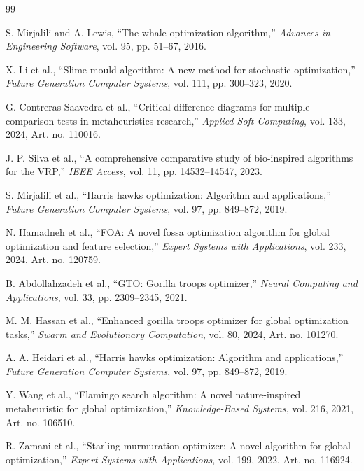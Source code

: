 \documentclass[10pt,a4paper]{extarticle}
\begin{document}
\begin{thebibliography}{99}

 S. Mirjalili and A. Lewis, ``The whale optimization algorithm,'' \textit{Advances in Engineering Software}, vol. 95, pp. 51--67, 2016.

 X. Li et al., ``Slime mould algorithm: A new method for stochastic optimization,'' \textit{Future Generation Computer Systems}, vol. 111, pp. 300--323, 2020.

 G. Contreras-Saavedra et al., ``Critical difference diagrams for multiple comparison tests in metaheuristics research,'' \textit{Applied Soft Computing}, vol. 133, 2024, Art. no. 110016.

 J. P. Silva et al., ``A comprehensive comparative study of bio-inspired algorithms for the VRP,'' \textit{IEEE Access}, vol. 11, pp. 14532--14547, 2023.

 S. Mirjalili et al., ``Harris hawks optimization: Algorithm and applications,'' \textit{Future Generation Computer Systems}, vol. 97, pp. 849--872, 2019.

 N. Hamadneh et al., ``FOA: A novel fossa optimization algorithm for global optimization and feature selection,'' \textit{Expert Systems with Applications}, vol. 233, 2024, Art. no. 120759.

 B. Abdollahzadeh et al., ``GTO: Gorilla troops optimizer,'' \textit{Neural Computing and Applications}, vol. 33, pp. 2309--2345, 2021.

 M. M. Hassan et al., ``Enhanced gorilla troops optimizer for global optimization tasks,'' \textit{Swarm and Evolutionary Computation}, vol. 80, 2024, Art. no. 101270.

 A. A. Heidari et al., ``Harris hawks optimization: Algorithm and applications,'' \textit{Future Generation Computer Systems}, vol. 97, pp. 849--872, 2019.

 Y. Wang et al., ``Flamingo search algorithm: A novel nature-inspired metaheuristic for global optimization,'' \textit{Knowledge-Based Systems}, vol. 216, 2021, Art. no. 106510.

 R. Zamani et al., ``Starling murmuration optimizer: A novel algorithm for global optimization,'' \textit{Expert Systems with Applications}, vol. 199, 2022, Art. no. 116924.


\end{thebibliography}
\end{document}

